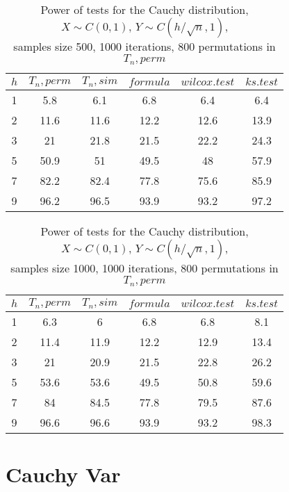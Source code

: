 \documentclass{report}
\begin{document}
\begin{longtable}{|c|c|c|c|c|c|}
  \caption{Power of tests for the Cauchy distribution, \\
           $X\sim C(0,1)$, $Y\sim C(h/\sqrt{n},1)$, \\
           samples size 500, 1000 iterations, 800 permutations in $T_n, perm$} \\
  \hline
  $h$ & $T_n, perm$ & $T_n, sim$ & $formula$ & $wilcox.test$ & $ks.test$ \\ \hline
  1 & 5.8   & 6.1      & 6.8       & 6.4           & 6.4       \\
  2 & 11.6  & 11.6     & 12.2      & 12.6          & 13.9      \\
  3 & 21    & 21.8     & 21.5      & 22.2          & 24.3      \\
  5 & 50.9  & 51       & 49.5      & 48            & 57.9      \\
  7 & 82.2  & 82.4     & 77.8      & 75.6          & 85.9      \\
  9 & 96.2  & 96.5     & 93.9      & 93.2          & 97.2      \\ \hline
\end{longtable}

\begin{longtable}{|c|c|c|c|c|c|}
  \caption{Power of tests for the Cauchy distribution, \\
           $X\sim C(0,1)$, $Y\sim C(h/\sqrt{n},1)$, \\
           samples size 1000, 1000 iterations, 800 permutations in $T_n, perm$} \\
  \hline
  $h$  & $T_n, perm$ & $T_n, sim$ & $formula$ & $wilcox.test$ & $ks.test$ \\ \hline
  1 & 6.3 & 6 & 6.8 & 6.8 & 8.1 \\
  2 & 11.4 & 11.9 & 12.2 & 12.9 & 13.4 \\
  3 & 21 & 20.9 & 21.5 & 22.8 & 26.2 \\
  5 & 53.6 & 53.6 & 49.5 & 50.8 & 59.6 \\
  7 & 84 & 84.5 & 77.8 & 79.5 & 87.6 \\
  9 & 96.6 & 96.6 & 93.9 & 93.2 & 98.3 \\
  \hline
\end{longtable}

\newpage

\section*{Cauchy Var}
\end{document}
